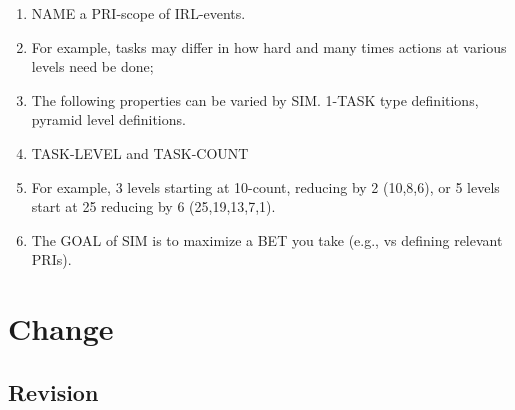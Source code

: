 \documentclass[
]{book}
\providecommand{\tightlist}{%
  \setlength{\itemsep}{0pt}\setlength{\parskip}{0pt}}
\begin{document}
\begin{enumerate}
  \begin{enumerate}
  \def\labelenumii{\arabic{enumii}.}
  \tightlist
  \item
    NAME a PRI-scope of IRL-events.
  \item
    For example, tasks may differ in how hard and many times actions
    at various levels need be done;
  \item
    The following properties can be varied by SIM. 1-TASK type
    definitions, pyramid level definitions.
  \item
    TASK-LEVEL and TASK-COUNT
  \item
    For example, 3 levels starting at 10-count, reducing by 2
    (10,8,6), or 5 levels start at 25 reducing by 6 (25,19,13,7,1).
  \item
    The GOAL of SIM is to maximize a BET you take (e.g., vs defining
    relevant PRIs).
  \end{enumerate}
\end{enumerate}

\hypertarget{change}{%
\chapter{Change}\label{change}}

\hypertarget{revision}{%
\section{Revision}\label{revision}}
\end{document}
